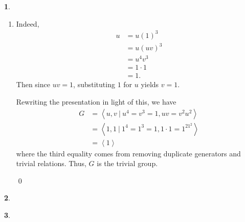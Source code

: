 \documentclass[12pt]{article}
\theoremstyle{definition}
\newtheorem{ex}{}
\begin{document}
\begin{ex}
\begin{enumerate}[label=(\alph*)]
\begin{align*}
			      uv & = v^2u^2   \\
			         & = u^2v^2   \\
			         & = u(uv)v   \\
			         & = (uv)(uv) \\
			         & = (uv)^2.
		      \end{align*}
		      Multiplying by $(uv)^{-1}$ on both sides yields $1 = uv$.
		\item Indeed, \begin{align*}
			      u & = u(1)^3    \\
			        & = u(uv)^3   \\
			        & = u^4v^3    \\
			        & = 1 \cdot 1 \\
			        & = 1.
		      \end{align*}
		      Then since $uv = 1$, substituting $1$ for $u$ yields $v = 1$.

		      Rewriting the presentation in light of this, we have \begin{align*}
			      G & = \left\langle u, v\ |\ u^4 = v^3 = 1, uv = v^2u^2 \right\rangle        \\
			        & = \left\langle 1, 1\ |\ 1^4 = 1^3 = 1, 1 \cdot 1 = 1^21^2 \right\rangle \\
			        & = \left\langle 1 \right\rangle
		      \end{align*}
		      where the third equality comes from removing duplicate generators and trivial relations.
		      Thus, $G$ is the trivial group.

		      \qed
	\end{enumerate}
\end{ex}

\begin{ex}

\end{ex}

\begin{ex}

\end{ex}

\end{document}

